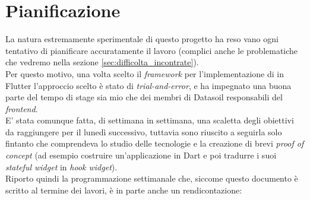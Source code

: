 \section{Pianificazione}
\label{sec:pianificazione}
La natura estremamente sperimentale di questo progetto ha reso vano ogni tentativo di pianificare accuratamente il lavoro (complici anche le problematiche che vedremo nella sezione \ref{sec:difficolta_incontrate}).\\
Per questo motivo, una volta scelto il \textit{framework} per l'implementazione di \asa{} in Flutter l'approccio scelto è stato di \textit{trial-and-error}, e ha impegnato una buona parte del tempo di stage sia mio che dei membri di Datasoil responsabili del \textit{frontend}.\\
E' stata comunque fatta, di settimana in settimana, una scaletta degli obiettivi da raggiungere per il lunedì successivo, tuttavia sono riuscito a seguirla solo fintanto che comprendeva lo studio delle tecnologie e la creazione di brevi \textit{proof of concept} (ad esempio costruire un'applicazione in Dart e poi tradurre i suoi \textit{stateful widget} in \textit{hook widget}).\\
Riporto quindi la programmazione settimanale che, siccome questo documento è scritto al termine dei lavori, è in parte anche un rendicontazione:

